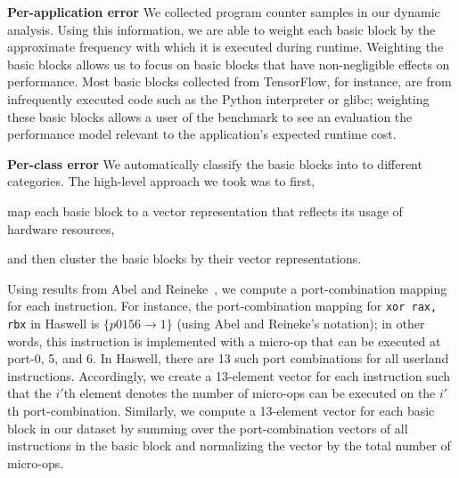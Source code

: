 \textbf{Per-application error}
We collected program counter samples
in our dynamic analysis.
Using this information, we are able to weight each basic block by
the approximate frequency with which it is executed during runtime.
Weighting the basic blocks allows us to focus on basic blocks that have
non-negligible effects on performance.
Most basic blocks collected from TensorFlow\cite{tensorflow},
for instance, are from infrequently executed code 
such as the Python interpreter or glibc;
weighting these basic blocks allows a user of the benchmark
to see an evaluation the performance model relevant
to the application's expected runtime cost.

\textbf{Per-class error} 
We automatically classify the basic blocks into
to different categories.
The high-level approach we took was to first,
\begin{enumerate*}
\item map each basic block to a vector representation
that reflects its usage of hardware resources,
\item and then cluster the basic blocks by their vector representations.
\end{enumerate*}

Using results from Abel and Reineke~\cite{uops},
we compute a port-combination mapping for each instruction.
For instance,
the port-combination mapping for \verb|xor rax, rbx| in Haswell
is $\{ p0156 \rightarrow 1 \}$ (using Abel and Reineke's notation);
in other words, this instruction is implemented 
with a micro-op that can be executed at port-0, 5, and 6.
In Haswell, there are 13 such port combinations for all userland instructions.
Accordingly, we create a 13-element vector for each instruction such that
the $i'$th element denotes the number of micro-ops can be executed
on the $i'$th port-combination.
Similarly, we compute a 13-element vector for each basic block
in our dataset by summing over the port-combination vectors
of all instructions in the basic block and normalizing the vector by 
the total number of micro-ops.


